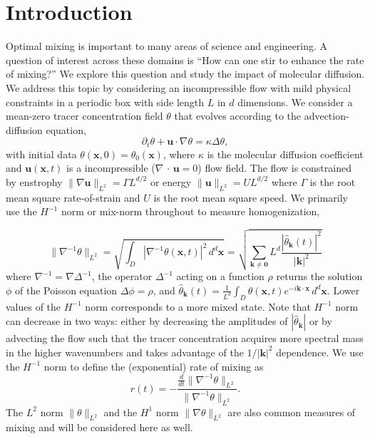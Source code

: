 \documentclass[12pt]{iopart}
\newcommand{\ddt}[1]{\frac{d #1}{dt}}
\newcommand{\hmone}[1]{\|\nabla^{-1} #1\|_{L^{2}}}
\newcommand{\ltwo}[1]{\|#1\|_{L^{2}}}
\newcommand{\hone}[1]{\| \nabla #1\|_{L^{2}}}
\newcommand{\sint}[1]{\int_{D} #1 \, d^{d}\mathbf{x}}
\renewcommand{\vec}[1]{\mathbf{#1}}
\renewcommand{\u}{\mathbf{u}}
\newcommand{\ppt}[1]{\partial_{t} #1}
\newcommand{\lap}{\Delta }
\begin{document}
\section{Introduction}

Optimal mixing is important to many areas of science and engineering. A question of interest across these domains is ``How can one stir to enhance the rate of mixing?'' We explore this question and study the impact of molecular diffusion. We address this topic by considering an incompressible flow with mild physical constraints in a periodic box with side length $L$ in $d$ dimensions. We consider a mean-zero tracer concentration field $\theta$ that evolves according to the advection-diffusion equation,
\begin{equation}
	\label{eq:PDE_advection}
	\ppt{\theta}+\mathbf{u}\cdot \nabla \theta=\kappa \lap\theta,
\end{equation}
with initial data $\theta(\mathbf{x},0)=\theta_{0}(\mathbf{x})$, where $\kappa$ is the molecular diffusion coefficient and $\mathbf{u}(\mathbf{x},t)$ is a incompressible ($\nabla\,\cdot\, \vec{u}=0$) flow field. The flow is constrained by enstrophy $\ltwo{\nabla\u} = \Gamma L^{d/2}$ or energy $\ltwo{\u} = UL^{d/2}$ where $\Gamma$ is the root mean square rate-of-strain and $U$ is the root mean square speed. We primarily use the $H^{-1}$ norm or mix-norm throughout to measure homogenization,   

\begin{equation}
\hmone{\theta}=\sqrt{\sint{ |\nabla^{-1} \theta( \vec{x},t)|^2}}=\sqrt{ \sum_{\vec{k}\neq \vec{0}} L^d \frac{|\hat{\theta}_{\vec{k}}(t)|^{2}}{|\vec{k}|^2}}
\end{equation}
where $\nabla^{-1}=\nabla \Delta^{-1}$, the operator $\Delta^{-1}$ acting on  a function $\rho$ returns the solution $\phi$ of the Poisson equation $ \Delta \phi = \rho $, and $\hat{\theta}_{\vec{k}}(t) =  \frac{1}{L^{d}}\sint{\theta(\vec{x},t)e^{-i\vec{k}\cdot\vec{x}}}$.  Lower values of the  $H^{-1}$ norm corresponds to a more mixed state. Note that $H^{-1}$ norm can decrease in two ways: either by decreasing the amplitudes of $|\hat{\theta}_{\vec{k}}|$ or by advecting the flow such that the tracer concentration acquires more spectral mass in the higher wavenumbers and takes advantage of the $1/|\vec{k}|^2$ dependence. We use the $H^{-1}$ norm to define the (exponential) rate of mixing as
\begin{equation}
\label{eq:rate}
r(t) = -  \frac{\ddt{}\hmone{\theta}}{\hmone{\theta}}.
\end{equation}
The $L^{2}$ norm $\ltwo{\theta}$ and the $H^{1}$ norm $\hone{\theta}$ are also common measures of mixing and will be considered here as well. 
\end{document}
